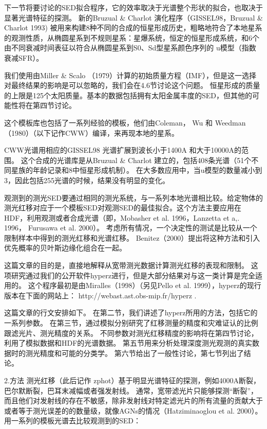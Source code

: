  
下一节将要讨论的SED拟合程序，它的效率取决于光谱整个形状的拟合，也取决于显著光谱特征的探测。
新的Bruzual \& Charlot 演化程序（GISSEL98，Bruzual \& Charlot 1993) 被用来构建8种不同的合成的恒星形成历史，粗略地符合了本地星系的观测性质，从椭圆星系到不规则星系：星爆系统，恒定的恒星形成系统，和6个由不同衰减时间表征以符合从椭圆星系到S0、Sd型星系颜色序列的 u模型（指数衰减SFR）。
 
我们使用由Miller \& Scalo （1979）计算的初始质量方程（IMF），但是这一选择对最终结果的影响是可以忽略的，我们会在4.6节讨论这个问题。
恒星形成的质量的上限是125个太阳质量。基本的数据包括拥有太阳金属丰度的SED，但其他的可能性将在第四节讨论。
 
这个模板库也包括了一系列经验的模板，他们由Coleman， Wu 和 Weedman（1980）（以下记作CWW）编译，来再现本地的星系。
 
CWW光谱用相应的GISSEL98 光谱扩展到波长小于1400A 和大于10000A的范围。
这个合成的光谱库是从Bruzual \& Charlot 建立的，包括408条光谱（51个不同星族的年龄记录和8中恒星形成机制）。
在大多数应用中，当u模型的数量减小到3，因此包括255光谱的时候，结果没有明显的变化。
 
观测到的测光SED要通过相同的测光系统，与一系列本地光谱相比较。给定物体的测光红移对应于一个模板SED对观测SED的最佳拟合。这个方法主要应用在HDF，利用观测或者合成光谱（即，Mobasher et al. 1996，Lanzetta et a,. 1996， Furusawa et al. 2000）。
考虑所有情况，一个决定性的测试是比较从一个限制样本中得到的测光红移和光谱红移。
Benitez（2000）提出将这种方法和引入优先概率的贝叶斯边缘化组合在一起。
 
这篇文章的目的是，直接地解释从宽带测光数据计算测光红移的表现和限制。
这项研究通过我们的公开软件hyperz进行，但是大部分结果对与这一类计算是完全适用的。
这个程序最初是由Miralles（1998）（另见Pello et al. 1999），hyperz的现行版本在下面的网站上：
http://webast.ast.obs-mip.fr/hyperz .
 
这篇文章的行文安排如下。
在第二节，我们讲述了hyperz所用的方法，包括它的一系列参数。
在第三节，通过模拟分别研究了红移测量的精度和灾难证认的比例跟滤光片、测光精度的关系。
不同参数对测光红移精度的影响将在第四节讨论，利用了模拟数据和HDF的光谱数据。
第五节用来分析处理深度测光观测的真实数据时的测光精度和可能的分类学。
第六节给出了一般性讨论，第七节列出了结论。
 
2.方法
测光红移（此后记作 zphot）基于明显光谱特征的探测，例如4000A断裂，巴尔默断裂，巴耳末减幅或者强发射线。
通常，宽带滤光片只能够探测“断裂”，而且他们对发射线的存在不敏感，除非发射线对特定滤光片的所有流量的贡献大于或者等于测光误差的的数量级，就像AGNs的情况（Hatziminaoglou et al. 2000）。
用一系列的模板光谱去比较观测到的SED：
 
